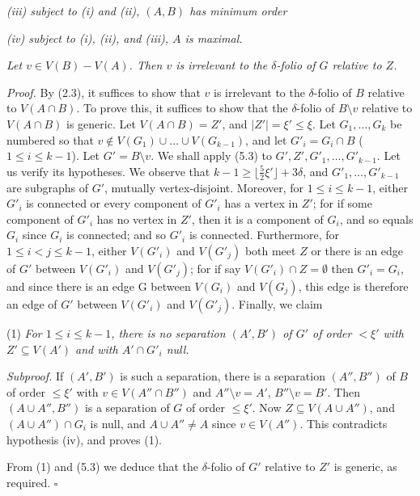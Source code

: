 \textit{(iii) subject to (i) and (ii), $(A, B)$ has minimum order}

\textit{(iv) subject to (i), (ii), and (iii), $A$ is maximal.}

\textit{Let $v \in V(B) - V(A)$. Then $v$ is irrelevant to the $\delta$-folio of $G$ relative to $Z$.}

\textit{Proof.} By (2.3), it suffices to show that $v$ is irrelevant to the $\delta$-folio of $B$ relative to $V(A \cap B)$. To prove this, it suffices to show that the $\delta$-folio of $B \setminus v$ relative to $V(A \cap B)$ is generic. Let $V(A \cap B) = Z'$, and $|Z'| = \xi' \le \xi$. Let $G_1, \dots, G_k$ be numbered so that $v \notin V(G_1) \cup \dots \cup V(G_{k-1})$, and let $G'_i = G_i \cap B$ ($1 \le i \le k - 1$). Let $G' = B \setminus v$. We shall apply (5.3) to $G', Z', G'_1, \dots, G'_{k-1}$. Let us verify its hypotheses. We observe that $k - 1 \ge \lfloor \frac{5}{2}\xi' \rfloor + 3\delta$, and $G'_1, \dots, G'_{k-1}$ are subgraphs of $G'$, mutually vertex-disjoint. Moreover, for $1 \le i \le k - 1$, either $G'_i$ is connected or every component of $G'_i$ has a vertex in $Z'$; for if some component of $G'_i$ has no vertex in $Z'$, then it is a component of $G_i$, and so equals $G_i$ since $G_i$ is connected; and so $G'_i$ is connected. Furthermore, for $1 \le i < j \le k - 1$, either $V(G'_i)$ and $V(G'_j)$ both meet $Z$ or there is an edge of $G'$ between $V(G'_i)$ and $V(G'_j)$; for if say $V(G'_i) \cap Z = \emptyset$ then $G'_i = G_i$, and since there is an edge G between $V(G_i)$ and $V(G_j)$, this edge is therefore an edge of $G'$ between $V(G'_i)$ and $V(G'_j)$. Finally, we claim

\hspace*{12pt}(1) \textit{For $1 \le i \le k - 1$, there is no separation $(A', B')$ of $G'$ of order $< \xi'$ with $Z' \subseteq V(A')$ and with $A' \cap G'_i$ null.}

\textit{Subproof.} If $(A', B')$ is such a separation, there is a separation $(A'', B'')$ of $B$ of order $\le \xi'$ with $v \in V(A'' \cap B'')$ and $A'' \setminus v = A'$, $B'' \setminus v = B'$. Then $(A \cup A'', B'')$ is a separation of $G$ of order $\le \xi'$. Now $Z \subseteq V(A \cup A'')$, and $(A \cup A'') \cap G_i$ is null, and $A \cup A'' \ne A$ since $v \in V(A'')$. This contradicts hypothesis (iv), and proves (1).

From (1) and (5.3) we deduce that the $\delta$-folio of $G'$ relative to $Z'$ is generic, as required. $\square$

